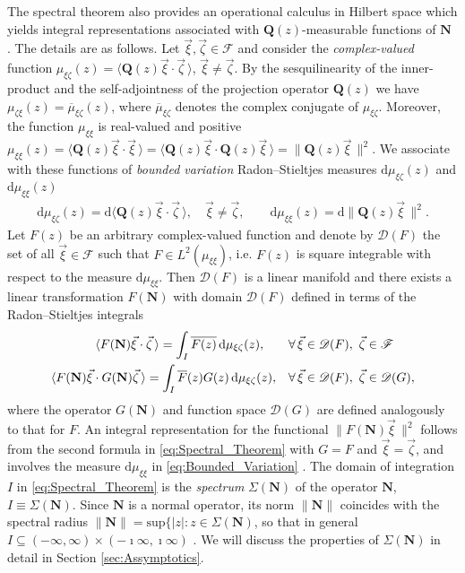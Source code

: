 \documentclass[11pt]{amsart}
\renewcommand{\d}{\mathrm{d}}
\newcommand{\Qb}{\mathbf{Q}}
\newcommand{\Nb}{\mathbf{N}}
\newcommand{\Fs}{\mathscr{F}}
\begin{document}
The spectral theorem also provides an operational calculus in Hilbert
space which yields integral representations associated with
$\Qb(z)$-measurable functions of $\Nb$ \cite{Stone:64}. The details
are as follows. Let $\vec{\xi},\vec{\zeta}\in\Fs$ and consider the
\emph{complex-valued} function $\mu_{\xi\zeta}(z)=\langle\Qb(z)\vec{\xi}\cdot\vec{\zeta}\,\rangle$,
$\vec{\xi}\neq\vec{\zeta}$. By the sesquilinearity of the inner-product and the
self-adjointness of the projection operator $\Qb(z)$ we have
$\mu_{\zeta\xi}(z)=\overline{\mu}_{\xi\zeta}(z)$, where $\overline{\mu}_{\xi\zeta}$ denotes
the complex conjugate of $\mu_{\xi\zeta}$. Moreover, the function $\mu_{\xi\xi}$ is
real-valued and positive
$\mu_{\xi\xi}(z)=\langle\Qb(z)\vec{\xi}\cdot\vec{\xi}\,\rangle=\langle\Qb(z)\vec{\xi}\cdot\Qb(z)\vec{\xi}\,\rangle
=\|\Qb(z)\vec{\xi}\,\|^2$. We associate with these functions of
\emph{bounded variation} Radon--Stieltjes measures $\d\mu_{\xi\zeta}(z)$ and
$\d\mu_{\xi\xi}(z)$ \cite{Stone:64}   
%
\begin{align}\label{eq:Bounded_Variation}
  \d\mu_{\xi\zeta}(z)=\d\langle\Qb(z)\vec{\xi}\cdot\vec{\zeta}\,\rangle, \quad
  \vec{\xi}\neq\vec{\zeta}, \qquad
  \d\mu_{\xi\xi}(z)=\d\|\Qb(z)\vec{\xi}\,\|^2.
\end{align}
%
Let $F(z)$ be an arbitrary complex-valued function and denote by
$\mathscr{D}(F)$ the set of all $\vec{\xi}\in\Fs$ such that
$F\in L^2(\mu_{\xi\xi})$, i.e. $F(z)$ is square integrable with respect to the
measure $\d\mu_{\xi\xi}$. 
Then $\mathscr{D}(F)$ is a linear manifold and there exists a linear
transformation $F(\Nb)$ with domain $\mathscr{D}(F)$ defined in terms
of the Radon--Stieltjes integrals \cite{Stone:64} 
%
\begin{align}\label{eq:Spectral_Theorem}
  \langle F(\Nb)\vec{\xi}\cdot\vec{\zeta}\,\rangle=\int_I\overline{F(z)}\,\d\mu_{\xi\zeta}(z), \qquad
  &\forall \, \vec{\xi}\in\mathscr{D}(F), \ \vec{\zeta}\in\Fs
  \\
  \langle F(\Nb)\vec{\xi}\cdot G(\Nb)\vec{\zeta}\,\rangle=\int_I\overline{F}(z)G(z)\,\d\mu_{\xi\zeta}(z),
  \quad
  &\forall \, \vec{\xi}\in\mathscr{D}(F), \ \vec{\zeta}\in\mathscr{D}(G),
  \notag
\end{align}
%
where the operator $G(\Nb)$ and function space $\mathscr{D}(G)$ are
defined analogously to that for $F$. An integral representation for
the functional $\|F(\Nb)\vec{\xi}\,\|^2$ follows from the second formula
in \eqref{eq:Spectral_Theorem} with $G=F$ and $\vec{\xi}=\vec{\zeta}$, and
involves the measure $\d\mu_{\xi\xi}$ in \eqref{eq:Bounded_Variation}
\cite{Stone:64}.  The domain of integration $I$ in
\eqref{eq:Spectral_Theorem} is the \emph{spectrum} $\Sigma(\Nb)$ of the
operator $\Nb$, $I\equiv\Sigma(\Nb)$. Since $\Nb$ is a normal operator, its norm 
$\|\Nb\|$ coincides with the spectral radius
$\|\Nb\|=\text{sup}\{|z|: z\in\Sigma(\Nb)$, so that in general
$I\subseteq(-\infty,\infty)\times(-\imath\infty,\imath\infty)$  \cite{Reed-1980,Stone:64}.  We will discuss the
properties of $\Sigma(\Nb)$ in detail in Section \ref{sec:Assymptotics}.  
\end{document}
